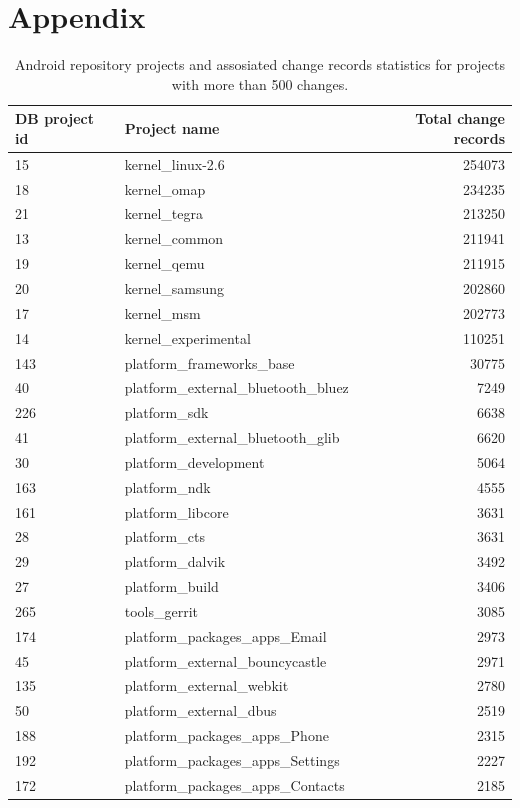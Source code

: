 \documentclass[a4paper,10pt]{article}
\numberwithin{equation}{subsection}
\begin{document}
\section{Appendix}
\begin{table}
  \caption{Android repository projects and assosiated change records statistics 
     for projects with more than 500 changes.}
  \label{tab:projects}
  \begin{tabularx}{\textwidth}{ | X | l | r |}
  \hline                       
  DB project id & Project name & Total change records \\
  \hline 
15 & kernel\_linux-2.6 & 254073\\ 
18 & kernel\_omap & 234235\\ 
21 & kernel\_tegra & 213250\\ 
13 & kernel\_common & 211941\\ 
19 & kernel\_qemu & 211915\\ 
20 & kernel\_samsung & 202860\\ 
17 & kernel\_msm & 202773\\ 
14 & kernel\_experimental & 110251\\ 
143 & platform\_frameworks\_base & 30775\\ 
40 & platform\_external\_bluetooth\_bluez & 7249\\ 
226 & platform\_sdk & 6638\\ 
41 & platform\_external\_bluetooth\_glib & 6620\\ 
30 & platform\_development & 5064\\ 
163 & platform\_ndk & 4555\\ 
161 & platform\_libcore & 3631\\ 
28 & platform\_cts & 3631\\ 
29 & platform\_dalvik & 3492\\ 
27 & platform\_build & 3406\\ 
265 & tools\_gerrit & 3085\\ 
174 & platform\_packages\_apps\_Email & 2973\\ 
45 & platform\_external\_bouncycastle & 2971\\ 
135 & platform\_external\_webkit & 2780\\ 
50 & platform\_external\_dbus & 2519\\ 
188 & platform\_packages\_apps\_Phone & 2315\\ 
192 & platform\_packages\_apps\_Settings & 2227\\ 
172 & platform\_packages\_apps\_Contacts & 2185\\ 

\end{tabularx}
\end{table}
\end{document}
